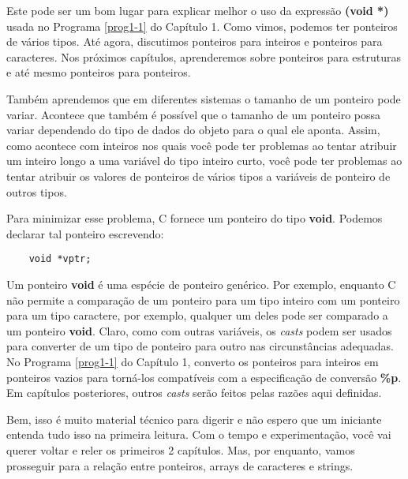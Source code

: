 Este pode ser um bom lugar para explicar melhor o uso da expressão \textbf{(void *)} usada no Programa \ref{prog1-1} do Capítulo 1. Como vimos, podemos ter ponteiros de vários tipos. Até agora, discutimos ponteiros para inteiros e ponteiros para caracteres. Nos próximos capítulos, aprenderemos sobre ponteiros para estruturas e até mesmo ponteiros para ponteiros.

Também aprendemos que em diferentes sistemas o tamanho de um ponteiro pode variar. Acontece que também é possível que o tamanho de um ponteiro possa variar dependendo do tipo de dados do objeto para o qual ele aponta. Assim, como acontece com inteiros nos quais você pode ter problemas ao tentar atribuir um inteiro longo a uma variável do tipo inteiro curto, você pode ter problemas ao tentar atribuir os valores de ponteiros de vários tipos a variáveis de ponteiro de outros tipos.

Para minimizar esse problema, C fornece um ponteiro do tipo \textbf{void}. Podemos declarar tal ponteiro escrevendo:
\begin{lstlisting}
	void *vptr;
\end{lstlisting}

Um ponteiro \textbf{void} é uma espécie de ponteiro genérico. Por exemplo, enquanto C não permite a comparação de um ponteiro para um tipo inteiro com um ponteiro para um tipo caractere, por exemplo, qualquer um deles pode ser comparado a um ponteiro \textbf{void}. Claro, como com outras variáveis, os \textit{casts} podem ser usados para converter de um tipo de ponteiro para outro nas circunstâncias adequadas. No Programa \ref{prog1-1} do Capítulo 1, converto os ponteiros para inteiros em ponteiros vazios para torná-los compatíveis com a especificação de conversão \textbf{\%p}. Em capítulos posteriores, outros \textit{casts} serão feitos pelas razões aqui definidas.

Bem, isso é muito material técnico para digerir e não espero que um iniciante entenda tudo isso na primeira leitura. Com o tempo e experimentação, você vai querer voltar e reler os primeiros 2 capítulos. Mas, por enquanto, vamos prosseguir para a relação entre ponteiros, arrays de caracteres e strings.

